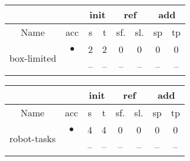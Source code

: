 \begin{tabular}[t]{|l||c||c|c|c|c|c|c||}
\hline
&& \multicolumn{2}{c|}{init}
& \multicolumn{2}{c|}{ref}
& \multicolumn{2}{c||}{add}\\\hline
\multicolumn{1}{|c||}{Name} & acc & s & t &sf. &sl. & sp & tp\\\hline\hline\multirow{2}{*}[0em]{box-limited}

& $\bullet$
& 2 & 2 & 0 & 0 & 0 & 0\\\cline{2-8}
& 
& -- & -- & -- & -- & -- & --\\\hline
\end{tabular}\begin{tabular}[t]{|l||c||c|c|c|c|c|c||}
\hline
&& \multicolumn{2}{c|}{init}
& \multicolumn{2}{c|}{ref}
& \multicolumn{2}{c||}{add}\\\hline
\multicolumn{1}{|c||}{Name} & acc & s & t &sf. &sl. & sp & tp\\\hline\hline\multirow{2}{*}[0em]{robot-tasks}

& $\bullet$
& 4 & 4 & 0 & 0 & 0 & 0\\\cline{2-8}
& 
& -- & -- & -- & -- & -- & --\\\hline
\end{tabular}